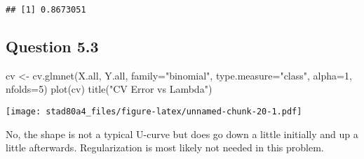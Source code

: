 \documentclass[
]{article}
\newenvironment{Shaded}{\begin{snugshade}}{\end{snugshade}}
\newcommand{\AttributeTok}[1]{\textcolor[rgb]{0.77,0.63,0.00}{#1}}
\newcommand{\DecValTok}[1]{\textcolor[rgb]{0.00,0.00,0.81}{#1}}
\newcommand{\FunctionTok}[1]{\textcolor[rgb]{0.00,0.00,0.00}{#1}}
\newcommand{\NormalTok}[1]{#1}
\newcommand{\OtherTok}[1]{\textcolor[rgb]{0.56,0.35,0.01}{#1}}
\newcommand{\StringTok}[1]{\textcolor[rgb]{0.31,0.60,0.02}{#1}}
\begin{document}
\begin{verbatim}
## [1] 0.8673051
\end{verbatim}

\hypertarget{question-5.3}{%
\subsection{Question 5.3}\label{question-5.3}}

\begin{Shaded}
\begin{Highlighting}[]
\NormalTok{cv }\OtherTok{\textless{}{-}} \FunctionTok{cv.glmnet}\NormalTok{(X.all, Y.all, }\AttributeTok{family=}\StringTok{"binomial"}\NormalTok{, }\AttributeTok{type.measure=}\StringTok{"class"}\NormalTok{, }\AttributeTok{alpha=}\DecValTok{1}\NormalTok{, }\AttributeTok{nfolds=}\DecValTok{5}\NormalTok{)}
\FunctionTok{plot}\NormalTok{(cv)}
\FunctionTok{title}\NormalTok{(}\StringTok{"CV Error vs Lambda"}\NormalTok{)}
\end{Highlighting}
\end{Shaded}

\texttt{[image: stad80a4\_files/figure-latex/unnamed-chunk-20-1.pdf]}

No, the shape is not a typical U-curve but does go down a little
initially and up a little afterwards. Regularization is most likely not
needed in this problem.
\end{document}
